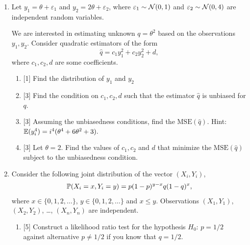 \begin{enumerate}
\begin{enumerate}
    \item {[2]} Verify that the obtained estimator corresponds to a global maximum of the likelihood function.
    
    \item {[1]} Find the sufficient statistic for \(\alpha\).
    
    \item {[3]} Check whether \(\hat{\alpha}_{MLE}\) is unbiased for \(\alpha\).
\end{enumerate}

\item Let $y_1 = \theta + \varepsilon_1$ and $y_2 = 2\theta + \varepsilon_2$,
where \(\varepsilon_1 \sim \cN(0, 1)\) and \(\varepsilon_2 \sim \cN(0, 4)\) are independent random variables.

We are interested in estimating unknown \(q = \theta^2\) based on the observations \(y_1, y_2\).
Consider quadratic estimators of the form
\[
\hat q = c_1 y_1^2 + c_2 y_2^2 + d,
\]
where \(c_1, c_2, d \) are some coefficients.

\begin{enumerate}

    \item {[1]} Find the distribution of $y_1$ and $y_2$

    \item {[3]} Find the condition on \(c_1, c_2, d\) such that the estimator $\hat q$ is unbiased for $q$.

    \item {[3]} Assuming the unbiasedness conditions, find the \(\text{MSE}(\hat q)\).
    Hint: \(\E(y_i^4) = i^4(\theta^4 + 6\theta^2 + 3).\)

    \item {[3]} Let \(\theta = 2\). Find the values of \(c_1, c_2\) and \(d\) that minimize the \(\text{MSE}(\hat q)\) subject to the unbiasedness condition.
\end{enumerate}

\item Consider the following joint distribution of the vector $(X_i, Y_i)$,
\[
\P(X_i = x, Y_i = y) = p(1-p)^{y-x}q(1-q)^{x},
\]
where $x \in \{0, 1, 2, \dots\}$, $y \in \{0, 1, 2, \dots \}$ and $x \leq y$. 
Observations $(X_1, Y_1)$, $(X_2, Y_2)$, \dots, $(X_n, Y_n)$ are independent.

\begin{enumerate}
    \item {[5]} Construct a likelihood ratio test for the hypothesis $H_0$: $p = 1/2$ against alternative $p\neq 1/2$ if you know that $q = 1/2$.
    

\end{enumerate}
\end{enumerate}
